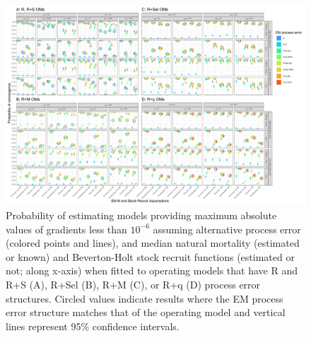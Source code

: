 \documentclass[
  12pt,
]{article}
\begin{document}
\begin{landscape}
\begin{figure}
\begin{center}
\includegraphics{type_3_convergence_plots}
\end{center}
\caption{Probability of estimating models providing maximum absolute values of gradients less than $10^{-6}$ assuming alternative process error (colored points and lines), and median natural mortality (estimated or known) and Beverton-Holt stock recruit functions (estimated or not; along x-axis) when fitted to operating models that have R and R+S (A), R+Sel (B), R+M (C), or R+q (D) process error structures. Circled values indicate results where the EM process error structure matches that of the operating model and vertical lines represent 95\% confidence intervals.}\label{gradient_convergence}
\end{figure}
\end{landscape}

\clearpage
\end{document}
